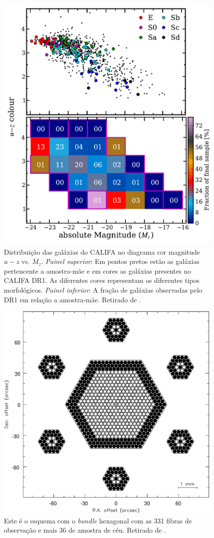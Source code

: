 \begin{figure}
    \includegraphics[height=0.5\textwidth]{figuras/figHusemann2013Fig2.pdf}
    \caption[Diagrama cor-magnitude para as galáxias do CALIFA.]
    {Distribui\c{c}\~ao das galáxias do CALIFA no diagrama cor magnitude $u-z$ vs. $M_z$. {\em Painel superior}: Em
    pontos pretos est\~ao as galáxias pertencente a amostra-m\~ae e em cores as galáxias presentes no CALIFA DR1. As
    diferentes cores representam os diferentes tipos morfológicos. {\em Painel inferior}: A fra\c{c}\~ao de galáxias
    observadas pelo DR1 em rela\c{c}\~ao a amostra-m\~ae. Retirado de \citet{Husemann2013}.}
    \label{fig:cm-uzMz}
\end{figure}

\begin{figure}
    \includegraphics[height=0.5\textwidth]{figuras/figVerheijen2004Fig5.pdf}
    \caption[Configura\c{c}\~ao do {\em bundle} de fibras do PPMAS/PPAK.]
    {Este é o esquema com o {\em bundle} hexagonal com as 331 fibras de observação e mais 36 de amostra de céu. Retirado
    de \citet{Verheijen2004}.}
    \label{fig:BundlePPAK}
\end{figure}


